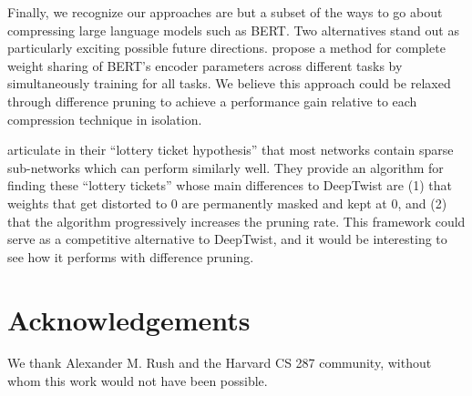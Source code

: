 \documentclass[10pt]{article}
\begin{document}
Finally, we recognize our approaches are but a subset of the ways to go about
compressing large language models such as BERT. Two alternatives stand out as
particularly exciting possible future directions. \citet{liu2019multi} propose a
method for complete weight sharing of BERT's encoder parameters across different
tasks by simultaneously training for all tasks. We believe this approach could
be relaxed through difference pruning to achieve a performance gain relative to
each compression technique in isolation. 

\citet{frankle2018lottery} articulate in their ``lottery ticket hypothesis''
that most networks contain sparse sub-networks which can perform similarly well.
They provide an algorithm for finding these ``lottery tickets'' whose main
differences to DeepTwist are (1) that weights that get distorted to 0 are
permanently masked and kept at 0, and (2) that the algorithm progressively
increases the pruning rate. This framework could serve as a competitive
alternative to DeepTwist, and it would be interesting to see how it performs
with difference pruning.

\section*{Acknowledgements}

We thank Alexander M. Rush and the Harvard CS 287 community, without whom
this work would not have been possible.



\end{document}
